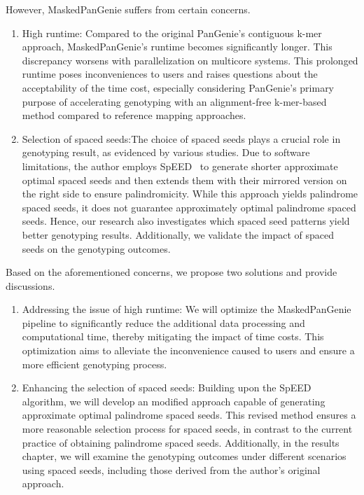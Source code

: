\documentclass{PHlab-thesis}
\begin{document}
However, MaskedPanGenie suffers from certain concerns.
\begin{enumerate}[label=(\roman*)]
    \item High runtime: Compared to the original PanGenie's contiguous k-mer approach, MaskedPanGenie's runtime becomes significantly longer. This discrepancy worsens with parallelization on multicore systems. This prolonged runtime poses inconveniences to users and raises questions about the acceptability of the time cost, especially considering PanGenie's primary purpose of accelerating genotyping with an alignment-free k-mer-based method compared to reference mapping approaches.
    \item Selection of spaced seeds:The choice of spaced seeds plays a crucial role in genotyping result, as evidenced by various studies. Due to software limitations, the author employs SpEED~\cite{Lucian2011SpEED} to generate shorter approximate optimal spaced seeds and then extends them with their mirrored version on the right side to ensure palindromicity. While this approach yields palindrome spaced seeds, it does not guarantee approximately optimal palindrome spaced seeds. Hence, our research also investigates which spaced seed patterns yield better genotyping results. Additionally, we validate the impact of spaced seeds on the genotyping outcomes.
\end{enumerate}
Based on the aforementioned concerns, we propose two solutions and provide discussions.
\begin{enumerate}[label=(\roman*)]
    \item Addressing the issue of high runtime: We will optimize the MaskedPanGenie pipeline to significantly reduce the additional data processing and computational time, thereby mitigating the impact of time costs. This optimization aims to alleviate the inconvenience caused to users and ensure a more efficient genotyping process.
    \item Enhancing the selection of spaced seeds: Building upon the SpEED algorithm, we will develop an modified approach capable of generating approximate optimal palindrome spaced seeds. This revised method ensures a more reasonable selection process for spaced seeds, in contrast to the current practice of obtaining palindrome spaced seeds. Additionally, in the results chapter, we will examine the genotyping outcomes under different scenarios using spaced seeds, including those derived from the author's original approach.
\end{enumerate}
\end{document}

